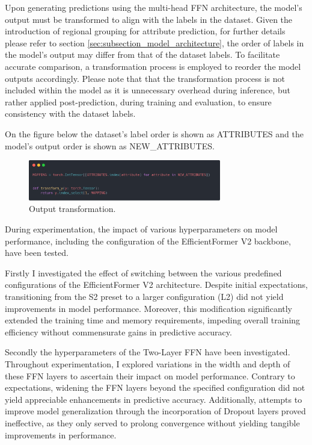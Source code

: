 \documentclass[a4paper,oneside]{article}
\begin{document}
Upon generating predictions using the multi-head FFN architecture, the model's output must be transformed to align with the labels in the dataset.
Given the introduction of regional grouping for attribute prediction, for further details please refer to section \ref{sec:subsection_model_architecture}, the order of labels in the model's output may differ from that of the dataset labels.
To facilitate accurate comparison, a transformation process is employed to reorder the model outputs accordingly.
Please note that that the transformation process is not included within the model as it is unnecessary overhead during inference, but rather applied post-prediction, during training and evaluation, to ensure consistency with the dataset labels.

On the figure below the dataset's label order is shown as ATTRIBUTES and the model's output order is shown as NEW\_ATTRIBUTES.

\begin{figure}[h]
  \includegraphics[width=0.75\textwidth]{OutputTransformation.png}
  \centering
  \caption{Output transformation.}
  \centering
\end{figure}

During experimentation, the impact of various hyperparameters on model performance, including the configuration of the EfficientFormer V2 backbone, have been tested.

Firstly I investigated the effect of switching between the various predefined configurations of the EfficientFormer V2 architecture.
Despite initial expectations, transitioning from the S2 preset to a larger configuration (L2) did not yield improvements in model performance.
Moreover, this modification significantly extended the training time and memory requirements, impeding overall training efficiency without commensurate gains in predictive accuracy.

Secondly the hyperparameters of the Two-Layer FFN have been investigated.
Throughout experimentation, I explored variations in the width and depth of these FFN layers to ascertain their impact on model performance.
Contrary to expectations, widening the FFN layers beyond the specified configuration did not yield appreciable enhancements in predictive accuracy.
Additionally, attempts to improve model generalization through the incorporation of Dropout layers proved ineffective, as they only served to prolong convergence without yielding tangible improvements in performance.
\end{document}

